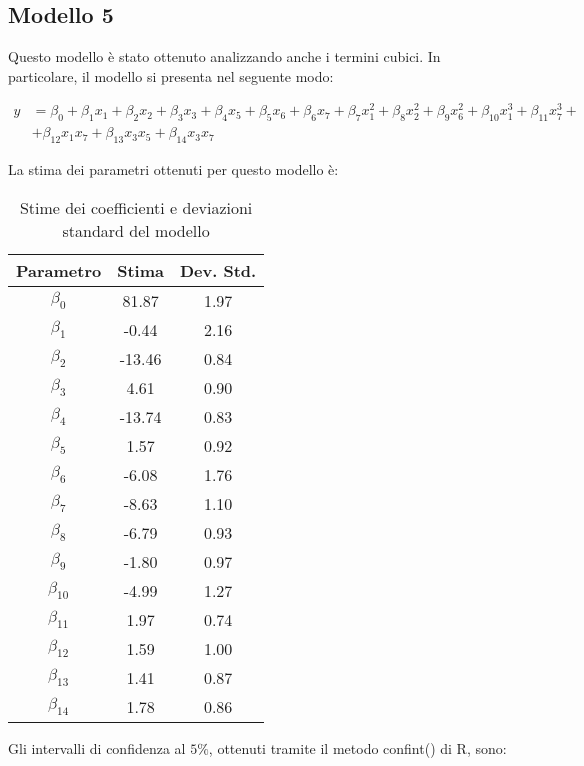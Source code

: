 \subsection{Modello 5}
Questo modello è stato ottenuto analizzando anche i termini cubici. In particolare, il modello si presenta nel seguente modo:

\begin{align*}
	y &= \beta_0 + \beta_1x_1 + \beta_2x_2 + \beta_3x_3 + \beta_4x_5 + \beta_5x_6 + \beta_6x_7 + \beta_7x_1^2 + \beta_8x_2^2 + \beta_9x_6^2 + \beta_{10}x_1^3 + \beta_{11}x_7^3+ \\
	&+ \beta_{12}x_1x_7 + \beta_{13}x_3x_5 + \beta_{14}x_3x_7
\end{align*}

La stima dei parametri ottenuti per questo modello è:
\begin{table}[H]
	\centering
	\begin{tabular}{|c|c|c|}
		\hline
		\textbf{Parametro} & \textbf{Stima} & \textbf{Dev. Std.} \\
		\hline
		$\beta_0$   & 81.87  & 1.97 \\
		$\beta_1$   & -0.44  & 2.16 \\
		$\beta_2$   & -13.46 & 0.84 \\
		$\beta_3$   & 4.61   & 0.90 \\
		$\beta_4$   & -13.74  & 0.83 \\
		$\beta_5$   & 1.57 & 0.92 \\
		$\beta_6$   & -6.08   & 1.76 \\
		$\beta_7$   & -8.63  & 1.10 \\
		$\beta_8$   & -6.79  & 0.93 \\
		$\beta_9$   & -1.80  & 0.97 \\
		$\beta_{10}$ & -4.99  & 1.27 \\
		$\beta_{11}$ & 1.97   & 0.74 \\
		$\beta_{12}$ & 1.59  & 1.00 \\
		$\beta_{13}$ & 1.41   & 0.87 \\
		$\beta_{14}$ & 1.78  & 0.86 \\
		\hline
	\end{tabular}
	\caption{Stime dei coefficienti e deviazioni standard del modello}
	\label{tab:stima_coef_std}
\end{table}
Gli intervalli di confidenza al $5\%$, ottenuti tramite il metodo confint() di R, sono:
